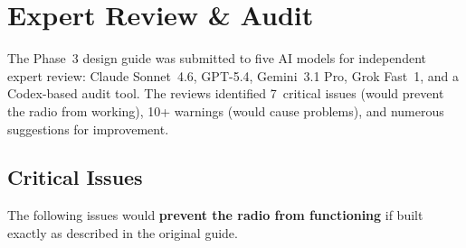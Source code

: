 
\section{Expert Review \& Audit}

The Phase~3 design guide was submitted to five AI models for independent expert
review: Claude Sonnet~4.6, GPT-5.4, Gemini~3.1 Pro, Grok Fast~1, and a
Codex-based audit tool.  The reviews identified 7~critical issues (would prevent
the radio from working), 10+ warnings (would cause problems), and numerous
suggestions for improvement.

\subsection{Critical Issues}

The following issues would \textbf{prevent the radio from functioning} if built
exactly as described in the original guide.

